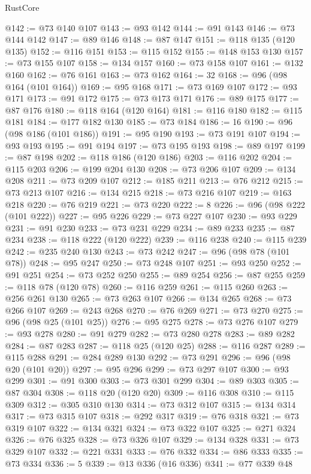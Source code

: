 \begin{lexlean}{RustCore}
\begin{coremodule}
@142 := @73 @140 @107
@143 := @93 @142
@144 := @91 @143
@146 := @73 @144 @142
@147 := @89 @146
@148 := @87 @147
@151 := @118 @135 (@120 @135)
@152 := @116 @151
@153 := @115 @152
@155 := @148 @153 @130
@157 := @73 @155 @107
@158 := @134 @157
@160 := @73 @158 @107
@161 := @132 @160
@162 := @76 @161
@163 := @73 @162
@164 := 32
@168 := @96 (@98 @164 (@101 @164))
@169 := @95 @168
@171 := @73 @169 @107
@172 := @93 @171
@173 := @91 @172
@175 := @73 @173 @171
@176 := @89 @175
@177 := @87 @176
@180 := @118 @164 (@120 @164)
@181 := @116 @180
@182 := @115 @181
@184 := @177 @182 @130
@185 := @73 @184
@186 := 16
@190 := @96 (@98 @186 (@101 @186))
@191 := @95 @190
@193 := @73 @191 @107
@194 := @93 @193
@195 := @91 @194
@197 := @73 @195 @193
@198 := @89 @197
@199 := @87 @198
@202 := @118 @186 (@120 @186)
@203 := @116 @202
@204 := @115 @203
@206 := @199 @204 @130
@208 := @73 @206 @107
@209 := @134 @208
@211 := @73 @209 @107
@212 := @185 @211
@213 := @76 @212
@215 := @73 @213 @107
@216 := @134 @215
@218 := @73 @216 @107
@219 := @163 @218
@220 := @76 @219
@221 := @73 @220
@222 := 8
@226 := @96 (@98 @222 (@101 @222))
@227 := @95 @226
@229 := @73 @227 @107
@230 := @93 @229
@231 := @91 @230
@233 := @73 @231 @229
@234 := @89 @233
@235 := @87 @234
@238 := @118 @222 (@120 @222)
@239 := @116 @238
@240 := @115 @239
@242 := @235 @240 @130
@243 := @73 @242
@247 := @96 (@98 @78 (@101 @78))
@248 := @95 @247
@250 := @73 @248 @107
@251 := @93 @250
@252 := @91 @251
@254 := @73 @252 @250
@255 := @89 @254
@256 := @87 @255
@259 := @118 @78 (@120 @78)
@260 := @116 @259
@261 := @115 @260
@263 := @256 @261 @130
@265 := @73 @263 @107
@266 := @134 @265
@268 := @73 @266 @107
@269 := @243 @268
@270 := @76 @269
@271 := @73 @270
@275 := @96 (@98 @25 (@101 @25))
@276 := @95 @275
@278 := @73 @276 @107
@279 := @93 @278
@280 := @91 @279
@282 := @73 @280 @278
@283 := @89 @282
@284 := @87 @283
@287 := @118 @25 (@120 @25)
@288 := @116 @287
@289 := @115 @288
@291 := @284 @289 @130
@292 := @73 @291
@296 := @96 (@98 @20 (@101 @20))
@297 := @95 @296
@299 := @73 @297 @107
@300 := @93 @299
@301 := @91 @300
@303 := @73 @301 @299
@304 := @89 @303
@305 := @87 @304
@308 := @118 @20 (@120 @20)
@309 := @116 @308
@310 := @115 @309
@312 := @305 @310 @130
@314 := @73 @312 @107
@315 := @134 @314
@317 := @73 @315 @107
@318 := @292 @317
@319 := @76 @318
@321 := @73 @319 @107
@322 := @134 @321
@324 := @73 @322 @107
@325 := @271 @324
@326 := @76 @325
@328 := @73 @326 @107
@329 := @134 @328
@331 := @73 @329 @107
@332 := @221 @331
@333 := @76 @332
@334 := @86 @333
@335 := @73 @334
@336 := 5
@339 := @13 @336 (@16 @336)
@341 := @77 @339 @48

\end{coremodule}
\end{lexlean}
